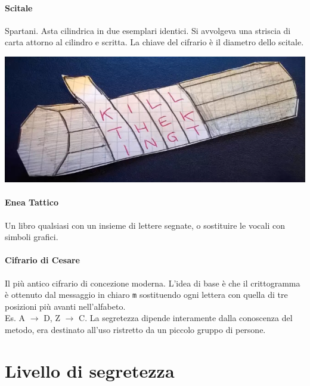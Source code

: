 \documentclass[10pt]{book}
\begin{document}
\paragraph{Scitale} Spartani. Asta cilindrica in due esemplari identici. Si avvolgeva una striscia di carta attorno al cilindro e scritta. La chiave del cifrario è il diametro dello scitale.
\begin{center}
	\includegraphics[scale=0.5]{2.png}
\end{center}
\paragraph{Enea Tattico} Un libro qualsiasi con un insieme di lettere segnate, o sostituire le vocali con simboli grafici.
\paragraph{Cifrario di Cesare} Il più antico cifrario di concezione moderna. L'idea di base è che il crittogramma è ottenuto dal messaggio in chiaro \texttt{m} sostituendo ogni lettera con quella di tre posizioni più avanti nell'alfabeto.\\
Es. A $\rightarrow$ D, Z $\rightarrow$ C. La segretezza dipende interamente dalla conoscenza del metodo, era destinato all'uso ristretto da un piccolo gruppo di persone.
\section{Livello di segretezza}
\end{document}
